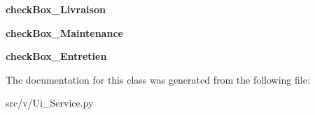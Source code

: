 \begin{DoxyCompactItemize}
\item 
\hypertarget{classv_1_1_ui___service_1_1_ui___service_a8af00299a9f0a5bbb07a4d57d532e993}{}{\bfseries check\+Box\+\_\+\+Livraison}\label{classv_1_1_ui___service_1_1_ui___service_a8af00299a9f0a5bbb07a4d57d532e993}

\item 
\hypertarget{classv_1_1_ui___service_1_1_ui___service_ae9eac3c9f84f213f34c9a2607605e969}{}{\bfseries check\+Box\+\_\+\+Maintenance}\label{classv_1_1_ui___service_1_1_ui___service_ae9eac3c9f84f213f34c9a2607605e969}

\item 
\hypertarget{classv_1_1_ui___service_1_1_ui___service_a6e195e5d5619a02a52a1a5d8d1a53076}{}{\bfseries check\+Box\+\_\+\+Entretien}\label{classv_1_1_ui___service_1_1_ui___service_a6e195e5d5619a02a52a1a5d8d1a53076}

\end{DoxyCompactItemize}


The documentation for this class was generated from the following file\+:\begin{DoxyCompactItemize}
\item 
src/v/Ui\+\_\+\+Service.\+py\end{DoxyCompactItemize}
